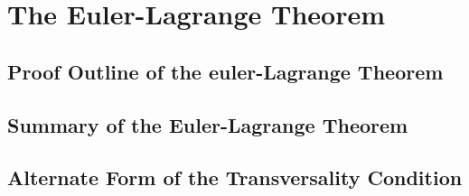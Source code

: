 \section{The Euler-Lagrange Theorem}

\subsection{Proof Outline of the euler-Lagrange Theorem}

\subsection{Summary of the Euler-Lagrange Theorem}

\subsection{Alternate Form of the Transversality Condition}
